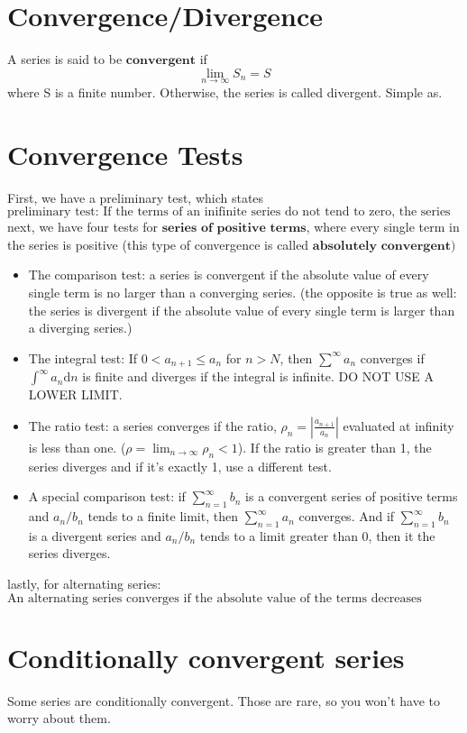 \documentclass[oneside]{book}
\numberwithin{equation}{chapter} %
\begin{document}
\section{Convergence/Divergence}
A series is said to be $\textbf{convergent}$ if 
$$\lim_{n\to\infty}S_n=S$$
where S is a finite number. Otherwise, the series is called divergent. Simple as. 
\section{Convergence Tests}
First, we have a preliminary test, which states
$$\boxed{\text{preliminary test: If the terms of an inifinite series do not tend to zero, the series diverges.}}$$
next, we have four tests for $\textbf{series of positive terms}$, where every single term in the series is positive (this type of convergence is called $\textbf{absolutely convergent})$
\begin{itemize}
	\item The comparison test: a series is convergent if the absolute value of every single term is no larger than a converging series. (the opposite is true as well: the series is divergent if the absolute value of every single term is larger than a diverging series.)
	\item The integral test: If $0<a_{n+1}\leq a_n$ for $n>N$, then $\sum^\infty a_n$ converges if $\int^\infty a_n\mathrm dn$ is finite and diverges if the integral is infinite. DO NOT USE A LOWER LIMIT.
	\item The ratio test: a series converges if the ratio, $\rho_n=\left|\frac{a_{n+1}}{a_n}\right|$ evaluated at infinity is less than one. ($\rho=\lim_{n\to\infty} \rho_n<1$). If the ratio is greater than 1, the series diverges and if it's exactly 1, use a different test.
	\item A special comparison test: if $\sum^\infty_{n=1} b_n$ is a convergent series of positive terms and $a_n/b_n$ tends to a finite limit, then $\sum^\infty_{n=1}a_n$ converges. And if $\sum^\infty_{n=1} b_n$ is a divergent series and $a_n/b_n$ tends to a limit greater than 0, then it the series diverges. 
\end{itemize}
lastly, for alternating series: 
$$\boxed{\text{An alternating series converges if the absolute value of the terms decreases steadily to zero.}}$$
\section{Conditionally convergent series}
Some series are conditionally convergent. Those are rare, so you won't have to worry about them. 
\end{document}
